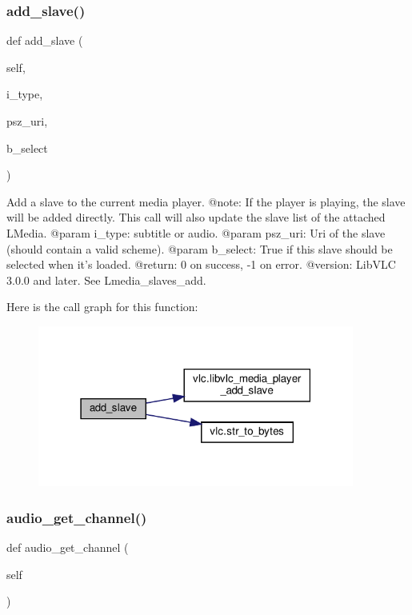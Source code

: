 \subsubsection{\texorpdfstring{add\+\_\+slave()}{add\_slave()}}
{\footnotesize\ttfamily def add\+\_\+slave (\begin{DoxyParamCaption}\item[{}]{self,  }\item[{}]{i\+\_\+type,  }\item[{}]{psz\+\_\+uri,  }\item[{}]{b\+\_\+select }\end{DoxyParamCaption})}

\begin{DoxyVerb}Add a slave to the current media player.
@note: If the player is playing, the slave will be added directly. This call
will also update the slave list of the attached L{Media}.
@param i_type: subtitle or audio.
@param psz_uri: Uri of the slave (should contain a valid scheme).
@param b_select: True if this slave should be selected when it's loaded.
@return: 0 on success, -1 on error.
@version: LibVLC 3.0.0 and later. See L{media_slaves_add}.
\end{DoxyVerb}
 Here is the call graph for this function\+:
\nopagebreak
\begin{figure}[H]
\begin{center}
\leavevmode
\includegraphics[width=295pt]{classvlc_1_1_media_player_a19d8a1e64748a83dced6420ae1d98de8_cgraph}
\end{center}
\end{figure}
\mbox{\label{classvlc_1_1_media_player_a9ba6b4faf2208b7bb1db2ad525a50ab0}} 
\subsubsection{\texorpdfstring{audio\+\_\+get\+\_\+channel()}{audio\_get\_channel()}}
{\footnotesize\ttfamily def audio\+\_\+get\+\_\+channel (\begin{DoxyParamCaption}\item[{}]{self }\end{DoxyParamCaption})}

